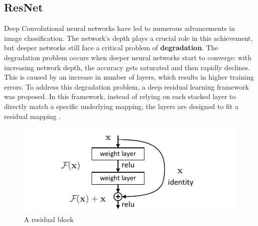 



\subsection{ResNet}
\label{subsec:ResNet}

Deep Convolutional neural networks have led to numerous advancements in image classification. The network's depth plays a crucial role in this achievement, but deeper networks still face a critical problem of \textbf{degradation}. The degradation problem occurs when deeper neural networks start to converge: with increasing network depth, the accuracy gets saturated and then rapidly declines. This is caused by an increase in number of layers, which results in higher training errors. To address this degradation problem, a deep residual learning framework was proposed. In this framework, instead of relying on each stacked layer to directly match a specific underlying mapping, the layers are designed to fit a residual mapping \cite{he2016deep}.

\begin{figure}[ht!]
    \centering
    \includegraphics[width=1.2\linewidth]{Rohit_Master_Thesis//Images/residual_block.pdf}
    \caption{A residual block \cite{he2016deep}}
    \label{fig:residual block}
\end{figure}

